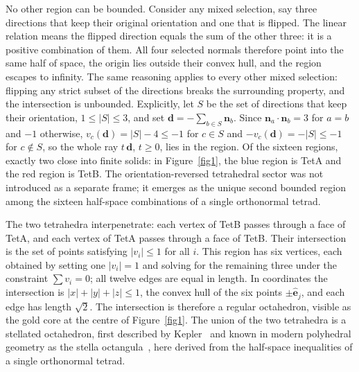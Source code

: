 \documentclass[twocolumn]{iopjournal}
\begin{document}
No other region can be bounded. Consider any mixed selection, say three
directions that keep their original orientation and one that is flipped. The
linear relation means the flipped direction equals the sum of the other three:
it is a positive combination of them. All four selected normals therefore
point into the same half of space, the origin lies outside their convex
hull, and the region escapes to infinity. The same reasoning applies to
every other mixed selection: flipping any strict subset of the directions breaks
the surrounding property, and the intersection is unbounded.
Explicitly, let $S$ be the set of directions that keep their orientation,
$1 \leq |S| \leq 3$, and set $\mathbf{d} = -\sum_{b\in S}\mathbf{n}_b$.
Since $\mathbf{n}_a\cdot\mathbf{n}_b = 3$ for $a=b$ and $-1$ otherwise,
$v_c(\mathbf{d}) = |S| - 4 \leq -1$ for $c\in S$ and
$-v_c(\mathbf{d}) = -|S| \leq -1$ for $c\notin S$, so the whole ray
$t\,\mathbf{d}$, $t \geq 0$, lies in the region. Of the
sixteen regions, exactly two close into finite solids: in
Figure~\ref{fig1}, the blue region is TetA and the red region is TetB.
The orientation-reversed tetrahedral sector was not introduced as a
separate frame; it emerges as the unique second bounded region among the
sixteen half-space combinations of a single orthonormal tetrad.

The two tetrahedra interpenetrate: each vertex of TetB passes through a
face of TetA, and each vertex of TetA passes through a face of TetB.
Their intersection is the set of points satisfying $|v_i| \leq 1$ for all
$i$. This region has six vertices, each obtained by setting one
$|v_i| = 1$ and solving for the remaining three under the constraint
$\sum v_i = 0$; all twelve edges are equal in length.
In coordinates the intersection is $|x|+|y|+|z| \leq 1$, the convex hull of
the six points $\pm\hat{\mathbf{e}}_j$, and each edge has length $\sqrt2$. The intersection is
therefore a regular octahedron, visible as the gold core at the centre of
Figure~\ref{fig1}. The union of the two tetrahedra is a stellated
octahedron, first described by Kepler~\cite{Kepler1619} and known in
modern polyhedral geometry as the stella
octangula~\cite{Cromwell1997}, here derived from the half-space inequalities
of a single orthonormal tetrad.
\end{document}
